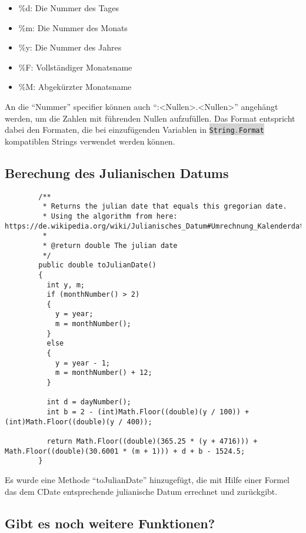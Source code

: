 \documentclass[12pt,pdftex,parskip=half]{scrartcl}
\newcommand{\inlinecode}[2]{\colorbox{lightgray}{\lstinline[language=#1]$#2$}}
\begin{document}
      \begin{itemize}
        \item \%d: Die Nummer des Tages
        \item \%m: Die Nummer des Monats
        \item \%y: Die Nummer des Jahres
        \item \%F: Vollständiger Monatsname
        \item \%M: Abgekürzter Monatsname
      \end{itemize}

      An die "`Nummer"' specifier können auch "`:<Nullen>.<Nullen>"' angehängt werden, um die Zahlen mit führenden Nullen aufzufüllen. Das Format entspricht dabei den Formaten, die bei einzufügenden Variablen in \inlinecode{C}{String.Format} kompatiblen Strings verwendet werden können.

      \clearpage


      \subsection{Berechung des Julianischen Datums}

      \begin{lstlisting}
        /**
         * Returns the julian date that equals this gregorian date.
         * Using the algorithm from here: https://de.wikipedia.org/wiki/Julianisches_Datum#Umrechnung_Kalenderdatum_%E2%86%92_JD
         *
         * @return double The julian date
         */
        public double toJulianDate()
        {
          int y, m;
          if (monthNumber() > 2)
          {
            y = year;
            m = monthNumber();
          }
          else
          {
            y = year - 1;
            m = monthNumber() + 12;
          }

          int d = dayNumber();
          int b = 2 - (int)Math.Floor((double)(y / 100)) + (int)Math.Floor((double)(y / 400));

          return Math.Floor((double)(365.25 * (y + 4716))) + Math.Floor((double)(30.6001 * (m + 1))) + d + b - 1524.5;
        }
      \end{lstlisting}

      Es wurde eine Methode "`toJulianDate"' hinzugefügt, die mit Hilfe einer Formel das dem CDate entsprechende julianische Datum errechnet und zurückgibt.

      \clearpage


      \subsection{Gibt es noch weitere Funktionen?}
\end{document}
